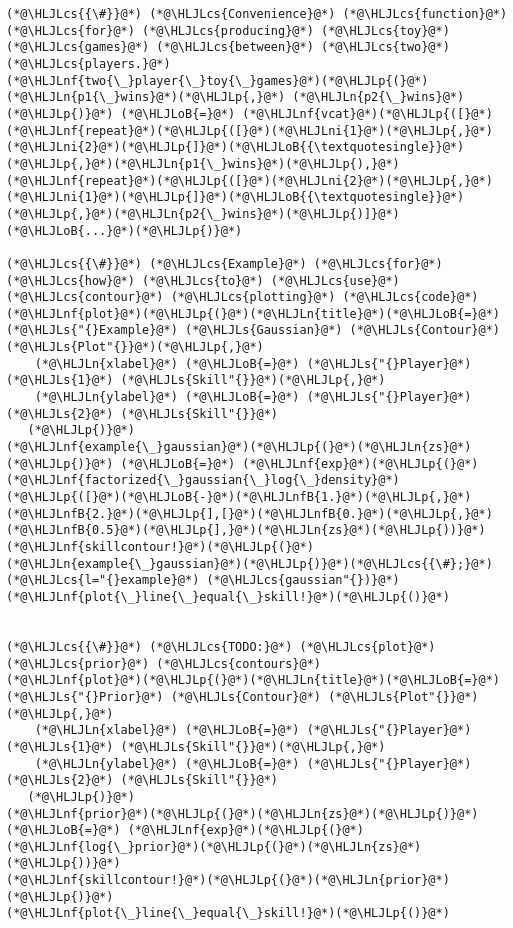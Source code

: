 \documentclass[12pt,a4paper]{article}
\newcommand{\HLJLn}[1]{#1}
\newcommand{\HLJLnf}[1]{\textcolor[RGB]{66,102,213}{#1}}
\newcommand{\HLJLs}[1]{\textcolor[RGB]{201,61,57}{#1}}
\newcommand{\HLJLnfB}[1]{\textcolor[RGB]{59,151,46}{#1}}
\newcommand{\HLJLni}[1]{\textcolor[RGB]{59,151,46}{#1}}
\newcommand{\HLJLoB}[1]{\textcolor[RGB]{102,102,102}{\textbf{#1}}}
\newcommand{\HLJLp}[1]{#1}
\newcommand{\HLJLcs}[1]{\textcolor[RGB]{153,153,119}{\textit{#1}}}
\begin{document}
\begin{lstlisting}
(*@\HLJLcs{{\#}}@*) (*@\HLJLcs{Convenience}@*) (*@\HLJLcs{function}@*) (*@\HLJLcs{for}@*) (*@\HLJLcs{producing}@*) (*@\HLJLcs{toy}@*) (*@\HLJLcs{games}@*) (*@\HLJLcs{between}@*) (*@\HLJLcs{two}@*) (*@\HLJLcs{players.}@*)
(*@\HLJLnf{two{\_}player{\_}toy{\_}games}@*)(*@\HLJLp{(}@*)(*@\HLJLn{p1{\_}wins}@*)(*@\HLJLp{,}@*) (*@\HLJLn{p2{\_}wins}@*)(*@\HLJLp{)}@*) (*@\HLJLoB{=}@*) (*@\HLJLnf{vcat}@*)(*@\HLJLp{([}@*)(*@\HLJLnf{repeat}@*)(*@\HLJLp{([}@*)(*@\HLJLni{1}@*)(*@\HLJLp{,}@*)(*@\HLJLni{2}@*)(*@\HLJLp{]}@*)(*@\HLJLoB{{\textquotesingle}}@*)(*@\HLJLp{,}@*)(*@\HLJLn{p1{\_}wins}@*)(*@\HLJLp{),}@*) (*@\HLJLnf{repeat}@*)(*@\HLJLp{([}@*)(*@\HLJLni{2}@*)(*@\HLJLp{,}@*)(*@\HLJLni{1}@*)(*@\HLJLp{]}@*)(*@\HLJLoB{{\textquotesingle}}@*)(*@\HLJLp{,}@*)(*@\HLJLn{p2{\_}wins}@*)(*@\HLJLp{)]}@*)(*@\HLJLoB{...}@*)(*@\HLJLp{)}@*)

(*@\HLJLcs{{\#}}@*) (*@\HLJLcs{Example}@*) (*@\HLJLcs{for}@*) (*@\HLJLcs{how}@*) (*@\HLJLcs{to}@*) (*@\HLJLcs{use}@*) (*@\HLJLcs{contour}@*) (*@\HLJLcs{plotting}@*) (*@\HLJLcs{code}@*)
(*@\HLJLnf{plot}@*)(*@\HLJLp{(}@*)(*@\HLJLn{title}@*)(*@\HLJLoB{=}@*)(*@\HLJLs{"{}Example}@*) (*@\HLJLs{Gaussian}@*) (*@\HLJLs{Contour}@*) (*@\HLJLs{Plot"{}}@*)(*@\HLJLp{,}@*)
    (*@\HLJLn{xlabel}@*) (*@\HLJLoB{=}@*) (*@\HLJLs{"{}Player}@*) (*@\HLJLs{1}@*) (*@\HLJLs{Skill"{}}@*)(*@\HLJLp{,}@*)
    (*@\HLJLn{ylabel}@*) (*@\HLJLoB{=}@*) (*@\HLJLs{"{}Player}@*) (*@\HLJLs{2}@*) (*@\HLJLs{Skill"{}}@*)
   (*@\HLJLp{)}@*)
(*@\HLJLnf{example{\_}gaussian}@*)(*@\HLJLp{(}@*)(*@\HLJLn{zs}@*)(*@\HLJLp{)}@*) (*@\HLJLoB{=}@*) (*@\HLJLnf{exp}@*)(*@\HLJLp{(}@*)(*@\HLJLnf{factorized{\_}gaussian{\_}log{\_}density}@*)(*@\HLJLp{([}@*)(*@\HLJLoB{-}@*)(*@\HLJLnfB{1.}@*)(*@\HLJLp{,}@*)(*@\HLJLnfB{2.}@*)(*@\HLJLp{],[}@*)(*@\HLJLnfB{0.}@*)(*@\HLJLp{,}@*)(*@\HLJLnfB{0.5}@*)(*@\HLJLp{],}@*)(*@\HLJLn{zs}@*)(*@\HLJLp{))}@*)
(*@\HLJLnf{skillcontour!}@*)(*@\HLJLp{(}@*)(*@\HLJLn{example{\_}gaussian}@*)(*@\HLJLp{)}@*)(*@\HLJLcs{{\#};}@*) (*@\HLJLcs{l="{}example}@*) (*@\HLJLcs{gaussian"{})}@*)
(*@\HLJLnf{plot{\_}line{\_}equal{\_}skill!}@*)(*@\HLJLp{()}@*)


(*@\HLJLcs{{\#}}@*) (*@\HLJLcs{TODO:}@*) (*@\HLJLcs{plot}@*) (*@\HLJLcs{prior}@*) (*@\HLJLcs{contours}@*)
(*@\HLJLnf{plot}@*)(*@\HLJLp{(}@*)(*@\HLJLn{title}@*)(*@\HLJLoB{=}@*)(*@\HLJLs{"{}Prior}@*) (*@\HLJLs{Contour}@*) (*@\HLJLs{Plot"{}}@*)(*@\HLJLp{,}@*)
    (*@\HLJLn{xlabel}@*) (*@\HLJLoB{=}@*) (*@\HLJLs{"{}Player}@*) (*@\HLJLs{1}@*) (*@\HLJLs{Skill"{}}@*)(*@\HLJLp{,}@*)
    (*@\HLJLn{ylabel}@*) (*@\HLJLoB{=}@*) (*@\HLJLs{"{}Player}@*) (*@\HLJLs{2}@*) (*@\HLJLs{Skill"{}}@*)
   (*@\HLJLp{)}@*)
(*@\HLJLnf{prior}@*)(*@\HLJLp{(}@*)(*@\HLJLn{zs}@*)(*@\HLJLp{)}@*) (*@\HLJLoB{=}@*) (*@\HLJLnf{exp}@*)(*@\HLJLp{(}@*)(*@\HLJLnf{log{\_}prior}@*)(*@\HLJLp{(}@*)(*@\HLJLn{zs}@*)(*@\HLJLp{))}@*)
(*@\HLJLnf{skillcontour!}@*)(*@\HLJLp{(}@*)(*@\HLJLn{prior}@*)(*@\HLJLp{)}@*)
(*@\HLJLnf{plot{\_}line{\_}equal{\_}skill!}@*)(*@\HLJLp{()}@*)
\end{lstlisting}
\end{document}
